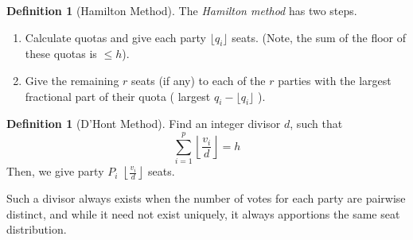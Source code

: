\documentclass{book}
\theoremstyle{plain}
\theoremstyle{definition}
\newtheorem{definition}[theorem]{Definition}
\theoremstyle{remark}
\begin{document}
\begin{definition}[Hamilton Method]
    The \emph{Hamilton method} has two steps.
    \begin{enumerate}
        \item Calculate quotas and give 
        each party $\lfloor q_i \rfloor$ seats.
        (Note, the sum of the floor of these quotas is $\leq h$).

        \item Give the remaining $r$ seats (if any) to each 
        of the $r$ parties with the largest fractional part of their quota (
            largest $q_i - \lfloor q_i \rfloor$
        ).

    \end{enumerate}
\end{definition}

\begin{definition}[D'Hont Method]
    Find an integer divisor $d$, such that 
    \[
        \sum_{i=1}^p \left\lfloor \frac{v_i}{d} \right\rfloor = h
    \]
    Then, we give party $P_i$ $\left\lfloor \frac{v_i}{d} \right\rfloor$ seats.

    Such a divisor always exists
    when the number of votes for each party are 
    pairwise distinct, and while it need not exist uniquely,
    it always apportions the same seat distribution.
\end{definition}
\end{document}
